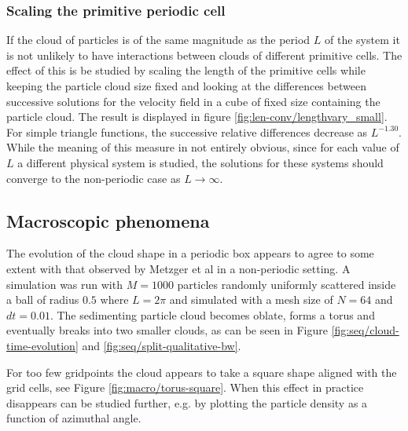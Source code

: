 \documentclass[a4paper,
twoside=false,abstract=false,numbers=noenddot,
titlepage=false,headings=small,parskip=half,version=last]{scrartcl}
\begin{document}
\subsubsection{Scaling the primitive periodic cell}\label{cellscale}
If the cloud of particles is of the same magnitude as the period $L$ of the system it is not unlikely to have interactions between clouds of different primitive cells.
The effect of this is be studied by scaling the length of the primitive cells while keeping the particle cloud size fixed and looking at the differences between successive solutions for the velocity field in a cube of fixed size containing the particle cloud.
The result is displayed in figure \ref{fig:len-conv/lengthvary_small}.
For simple triangle functions, the successive relative differences decrease as $L^{-1.30}$.
While the meaning of this measure in not entirely obvious, since for each value of $L$ a different physical system is studied, the solutions for these systems should converge to the non-periodic case as $L\rightarrow \infty$.

\subsection{Macroscopic phenomena}
The evolution of the cloud shape in a periodic box appears to agree to some extent with that observed by Metzger et al \cite{fallingclouds} in a non-periodic setting.
A simulation was run with $M=1000$ particles randomly uniformly scattered inside a ball of radius $0.5$ where $L=2\pi$ and simulated with a mesh size of $N=64$ and $dt=0.01$. 
The sedimenting particle cloud becomes oblate, forms a torus and eventually breaks into two smaller clouds, as can be seen in Figure \ref{fig:seq/cloud-time-evolution} and \ref{fig:seq/split-qualitative-bw}.

For too few gridpoints the cloud appears to take a square shape aligned with the grid cells, see Figure \ref{fig:macro/torus-square}. When this effect in practice disappears can be studied further, e.g. by plotting the particle density as a function of azimuthal angle.
\end{document}
